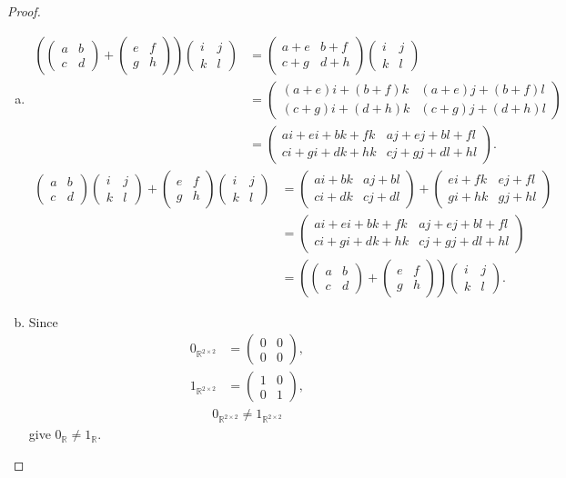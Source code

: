 \documentclass{amsart}
\newcommand{\bbr}{\mathbb{R}}
\newcommand{\aaa}{\left(\begin{smallmatrix}a&b\\c&d\end{smallmatrix}\right)}
\newcommand{\bbb}{\left(\begin{smallmatrix}e&f\\g&h\end{smallmatrix}\right)}
\newcommand{\ccc}{\left(\begin{smallmatrix}i&j\\k&l\end{smallmatrix}\right)}
\theoremstyle{plain}
\theoremstyle{definition}
\begin{document}
\begin{proof}
\begin{enumerate}[(a)]
		\item
			\begin{align*}
			\left(\aaa + \bbb\right)\ccc &= \left(\begin{smallmatrix}a+e&b+f\\c+g&d+h\end{smallmatrix}\right)\ccc \\ &= \left(\begin{smallmatrix}(a+e)i+(b+f)k&(a+e)j+(b+f)l\\(c+g)i+(d+h)k&(c+g)j+(d+h)l\end{smallmatrix}\right) \\ &= \left(\begin{smallmatrix}ai+ei+bk+fk&aj+ej+bl+fl\\ci+gi+dk+hk&cj+gj+dl+hl\end{smallmatrix}\right).
			\end{align*}
			\begin{align*}
			\aaa\ccc+\bbb\ccc &= \left(\begin{smallmatrix}ai+bk&aj+bl\\ci+dk&cj+dl\end{smallmatrix}\right)+\left(\begin{smallmatrix}ei+fk&ej+fl\\gi+hk&gj+hl\end{smallmatrix}\right) \\ &= \left(\begin{smallmatrix}ai+ei+bk+fk&aj+ej+bl+fl\\ci+gi+dk+hk&cj+gj+dl+hl\end{smallmatrix}\right) \\ &= \left(\aaa + \bbb\right)\ccc.
			\end{align*}
			\item 
			Since 
		\begin{align*}
			0_{\bbr^{2\times 2}} &= \left(\begin{smallmatrix}0&0\\0&0\end{smallmatrix}\right),\\
        	1_{\bbr^{2\times 2}} &= \left(\begin{smallmatrix}1&0\\0&1\end{smallmatrix}\right),
        \end{align*}
        \begin{align*}
        	0_{\bbr^{2\times 2}} \neq 1_{\bbr^{2\times 2}}
    	\end{align*}
    	give $0_{\bbr} \neq 1_{\bbr}$.
	\end{enumerate}


\end{proof}
\end{document}

